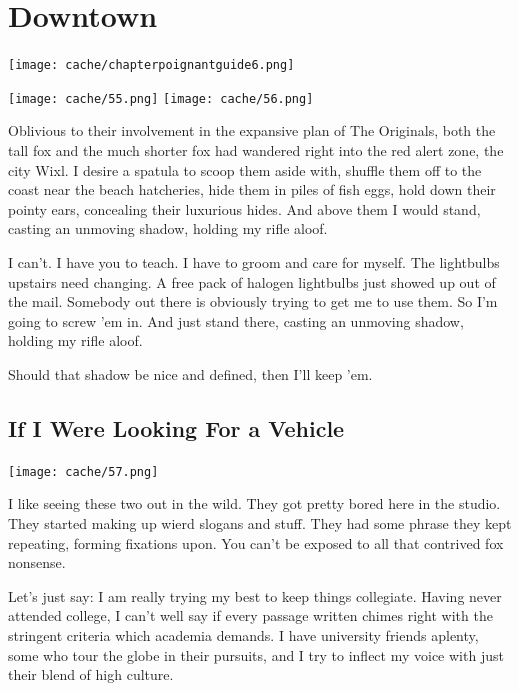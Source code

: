 \documentclass[12pt,twoside]{report}
\begin{document}
\newpage
\thispagestyle{empty}
\mbox{}
\newpage
\thispagestyle{empty}
\mbox{}
\cleartooddpage

\chapter{Downtown}
\vfill
\begin{center}
  \texttt{[image: cache/chapterpoignantguide6.png]}
\end{center}
\vspace{4.6cm}
\newpage
\thispagestyle{empty}
\mbox{}
\clearpage
	\texttt{[image: cache/55.png]}
        \texttt{[image: cache/56.png]}

Oblivious to their involvement in the expansive plan of The Originals,
both the tall fox and the much shorter fox had wandered right into the
red alert zone, the city Wixl.  I desire a spatula to scoop them aside
with, shuffle them off to the coast near the beach hatcheries, hide
them in piles of fish eggs, hold down their pointy ears, concealing
their luxurious hides.  And above them I would stand, casting an
unmoving shadow, holding my rifle aloof.

I can't.  I have you to teach.  I have to groom and care for myself.
The lightbulbs upstairs need changing.  A free pack of halogen
lightbulbs just showed up out of the mail.  Somebody out there is
obviously trying to get me to use them.  So I'm going to screw 'em in.
And just stand there, casting an unmoving shadow, holding my rifle
aloof.

Should that shadow be nice and defined, then I'll keep 'em.


\section{If I Were Looking For a Vehicle}


	\texttt{[image: cache/57.png]}

I like seeing these two out in the wild.  They got pretty bored here
in the studio.  They started making up wierd slogans and stuff.  They
had some phrase they kept repeating, forming fixations upon. You can't
be exposed to all that contrived fox nonsense.

Let's just say: I am really trying my best to keep things collegiate.
Having never attended college, I can't well say if every passage
written chimes right with the stringent criteria which academia
demands. I have university friends aplenty, some who tour the globe in
their pursuits, and I try to inflect my voice with just their blend of
high culture.
\end{document}
